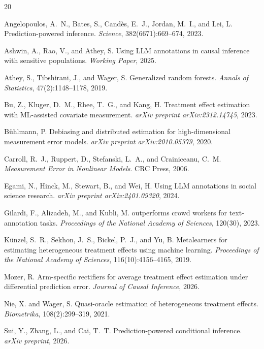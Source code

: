\documentclass[11pt,a4paper]{article}
\begin{document}

\begin{thebibliography}{20}

Angelopoulos, A.~N., Bates, S., Candès, E.~J., Jordan, M.~I., and Lei, L.
\newblock Prediction-powered inference.
\newblock \emph{Science}, 382(6671):669--674, 2023.

Ashwin, A., Rao, V., and Athey, S.
\newblock Using {LLM} annotations in causal inference with sensitive populations.
\newblock \emph{Working Paper}, 2025.

Athey, S., Tibshirani, J., and Wager, S.
\newblock Generalized random forests.
\newblock \emph{Annals of Statistics}, 47(2):1148--1178, 2019.

Bu, Z., Kluger, D.~M., Rhee, T.~G., and Kang, H.
\newblock Treatment effect estimation with {ML}-assisted covariate measurement.
\newblock \emph{arXiv preprint arXiv:2312.14745}, 2023.

B{\"u}hlmann, P.
\newblock Debiasing and distributed estimation for high-dimensional measurement error models.
\newblock \emph{arXiv preprint arXiv:2010.05379}, 2020.

Carroll, R.~J., Ruppert, D., Stefanski, L.~A., and Crainiceanu, C.~M.
\newblock \emph{Measurement Error in Nonlinear Models}.
\newblock CRC Press, 2006.

Egami, N., Hinck, M., Stewart, B., and Wei, H.
\newblock Using {LLM} annotations in social science research.
\newblock \emph{arXiv preprint arXiv:2401.09320}, 2024.

Gilardi, F., Alizadeh, M., and Kubli, M.
 outperforms crowd workers for text-annotation tasks.
\newblock \emph{Proceedings of the National Academy of Sciences}, 120(30), 2023.

K{\"u}nzel, S.~R., Sekhon, J.~S., Bickel, P.~J., and Yu, B.
\newblock Metalearners for estimating heterogeneous treatment effects using machine learning.
\newblock \emph{Proceedings of the National Academy of Sciences}, 116(10):4156--4165, 2019.

Mozer, R.
\newblock Arm-specific rectifiers for average treatment effect estimation under differential prediction error.
\newblock \emph{Journal of Causal Inference}, 2026.

Nie, X. and Wager, S.
\newblock Quasi-oracle estimation of heterogeneous treatment effects.
\newblock \emph{Biometrika}, 108(2):299--319, 2021.

Sui, Y., Zhang, L., and Cai, T.~T.
\newblock Prediction-powered conditional inference.
\newblock \emph{arXiv preprint}, 2026.

\end{thebibliography}
\end{document}
